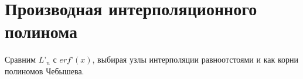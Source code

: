 \section{Производная интерполяционного полинома}
Сравним $L’_n$ с $erf’(x)$, выбирая узлы интерполяции равноотстоями и как корни полиномов Чебышева.

